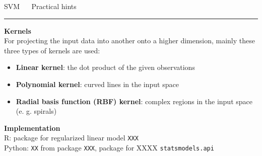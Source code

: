 \documentclass[11pt,compress,t,notes=noshow, xcolor=table]{beamer}
\begin{document}
\LARGE
\begin{frame}{\textcolor{gray!80}{SVM} ~~ Practical hints}
\normalsize
\vspace{-0.5cm}
\noindent \textcolor{gray!80}{\rule{\textwidth}{1pt}}

\vspace{0.3cm}

\footnotesize

  \textbf{\textcolor{gray!80}{Kernels}} \\
  \smallskip
 For projecting the input data into another onto a higher dimension, mainly these three types of kernels are used: 
 \begin{itemize}
 
 \item \textbf{Linear kernel}: the dot product of the given observations
 
 \item \textbf{Polynomial kernel}: curved lines in the input space
 
 \item \textbf{Radial basis function (RBF) kernel}: complex regions in the input space (e. g. spirals)
 
 \end{itemize}
 
 

\lz

  \textbf{\textcolor{gray!80}{Implementation}} \\
  \smallskip
  R: package for regularized linear model \texttt{XXX}\\
  Python: \texttt{XX} from package \texttt{XXX}, package for XXXX \texttt{statsmodels.api}

\end{frame}


% 
\end{document}
